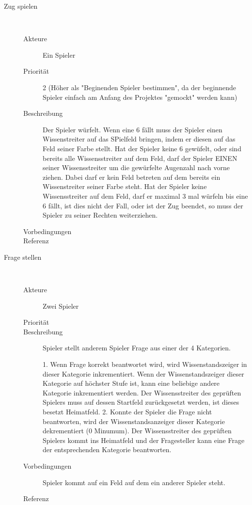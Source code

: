 \documentclass{scrartcl} %
\begin{document}
\begin{description}
   \item[Zug spielen]~\par
   \begin{description}
      \item[Akteure] Ein Spieler
      \item[Priorität] 2 (Höher als "Beginenden Spieler bestimmen", da der beginnende Spieler einfach am Anfang des Projektes "gemockt" werden kann)
      \item[Beschreibung] Der Spieler würfelt. Wenn eine 6 fällt muss der Spieler einen Wissenstreiter auf das SPielfeld bringen, indem er diesen auf das Feld seiner Farbe stellt. Hat der Spieler keine 6 gewüfelt, oder sind bereits alle Wissensstreiter auf dem Feld, darf der Spieler EINEN seiner Wissensstreiter um die gewürfelte Augenzahl nach vorne ziehen. Dabei darf er kein Feld betreten auf dem bereits ein Wissenstreiter seiner Farbe steht.
Hat der Spieler keine Wissensstreiter auf dem Feld, darf er maximal 3 mal würfeln bis eine 6 fällt, ist dies nicht der Fall, oder ist der Zug beendet, so muss der Spieler zu seiner Rechten weiterziehen.
      \item[Vorbedingungen] 
      \item[Referenz] 
   \end{description}
\end{description}
\begin{description}
   \item[Frage stellen]~\par
   \begin{description}
      \item[Akteure] Zwei Spieler
      \item[Priorität]
      \item[Beschreibung] Spieler stellt anderem Spieler Frage aus einer der 4 Kategorien.

1. Wenn Frage korrekt beantwortet wird, wird Wissenstandszeiger in dieser Kategorie inkrementiert. Wenn der Wissenstandszeiger dieser Kategorie auf höchster Stufe ist, kann eine beliebige andere Kategorie inkrementiert werden. Der Wissensstreiter des geprüften Spielers muss auf dessen Startfeld zurückgesetzt werden, ist dieses besetzt Heimatfeld.
2. Konnte der Spieler die Frage nicht beantworten, wird der Wissenstandsanzeiger dieser Kategorie dekrementiert (0 Minumum). Der Wissensstreiter des geprüften Spielers kommt ins Heimatfeld und der Fragesteller kann eine Frage der entsprechenden Kategorie beantworten. 
      \item[Vorbedingungen] Spieler kommt auf ein Feld auf dem ein anderer Spieler steht.
      \item[Referenz] 
   \end{description}
\end{description}
\end{document}
